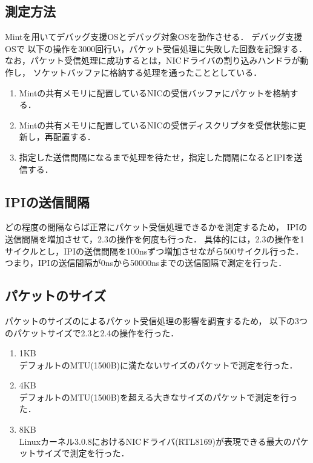 \documentclass[12pt]{jsarticle}
\begin{document}
\subsection{測定方法}\label{method}
Mintを用いてデバッグ支援OSとデバッグ対象OSを動作させる．
デバッグ支援OSで
以下の操作を3000回行い，パケット受信処理に失敗した回数を記録する．
なお，パケット受信処理に成功するとは，NICドライバの割り込みハンドラが動作し，
ソケットバッファに格納する処理を通ったこととしている．
\begin{enumerate}
    \item Mintの共有メモリに配置しているNICの受信バッファにパケットを格納する．
    \item Mintの共有メモリに配置しているNICの受信ディスクリプタを受信状態に更新し，再配置する．
    \item 指定した送信間隔になるまで処理を待たせ，指定した間隔になるとIPIを送信する．
\end{enumerate}

\subsection{IPIの送信間隔}\label{interval_ipi}
どの程度の間隔ならば正常にパケット受信処理できるかを測定するため，
IPIの送信間隔を増加させて，2.3の操作を何度も行った．
具体的には，2.3の操作を1サイクルとし，IPIの送信間隔を100nsずつ増加させながら500サイクル行った．
つまり，IPIの送信間隔が0nsから50000nsまでの送信間隔で測定を行った．

\subsection{パケットのサイズ}
パケットのサイズのによるパケット受信処理の影響を調査するため，
以下の3つのパケットサイズで2.3と2.4の操作を行った．
\begin{enumerate}
    \item 1KB\\
        デフォルトのMTU(1500B)に満たないサイズのパケットで測定を行った．
    \item 4KB\\
        デフォルトのMTU(1500B)を超える大きなサイズのパケットで測定を行った．
    \item 8KB\\
        Linuxカーネル3.0.8におけるNICドライバ(RTL8169)が表現できる最大のパケットサイズで測定を行った．
\end{enumerate}
\end{document}
